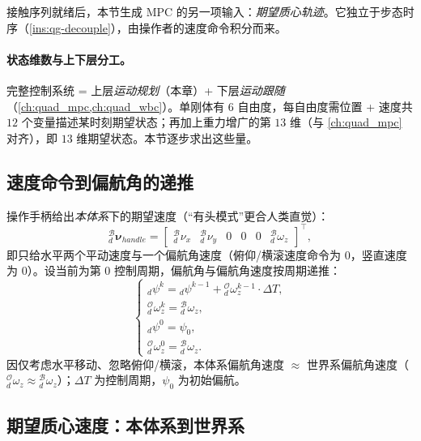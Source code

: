 接触序列就绪后，本节生成 MPC 的另一项输入：\emph{期望质心轨迹}。它独立于步态时序（\cref{ins:qg-decouple}），由操作者的速度命令积分而来。

\paragraph{状态维数与上下层分工。}
完整控制系统 = 上层\emph{运动规划}（本章）+ 下层\emph{运动跟随}（\cref{ch:quad_mpc,ch:quad_wbc}）。单刚体有 $6$ 自由度，每自由度需位置 + 速度共 $12$ 个变量描述某时刻期望状态；再加上重力增广的第 $13$ 维（与 \cref{ch:quad_mpc} 对齐），即 $13$ 维期望状态\cite{yu2021quadruped}。本节逐步求出这些量。

\subsection{速度命令到偏航角的递推}
\label{subsec:qg-yaw}

操作手柄给出\emph{本体系}下的期望速度（“有头模式”更合人类直觉）\cite{yu2021quadruped}：
\begin{equation}
  {}_d^{\mathcal{B}}\boldsymbol{\nu}_{handle}=
  \begin{bmatrix} {}_d^{\mathcal{B}}\nu_x & {}_d^{\mathcal{B}}\nu_y & 0 & 0 & 0 & {}_d^{\mathcal{B}}\omega_z\end{bmatrix}^\top,
  \label{eq:qg-handle}
\end{equation}
即只给水平两个平动速度与一个偏航角速度（俯仰/横滚速度命令为 $0$，竖直速度为 $0$）。设当前为第 $0$ 控制周期，偏航角与偏航角速度按周期递推\cite{yu2021quadruped}：
\begin{equation}
  \begin{cases}
  {}_d\psi^{k}={}_d\psi^{k-1}+{}_d^{\mathcal{O}}\omega_z^{k-1}\cdot\Delta T,\\
  {}_d^{\mathcal{O}}\omega_z^{k}={}_d^{\mathcal{B}}\omega_z,\\
  {}_d\psi^{0}=\psi_0,\\
  {}_d^{\mathcal{O}}\omega_z^{0}={}_d^{\mathcal{B}}\omega_z.
  \end{cases}
  \label{eq:qg-yaw-recur}
\end{equation}
因仅考虑水平移动、忽略俯仰/横滚，本体系偏航角速度 $\approx$ 世界系偏航角速度（${}_d^{\mathcal{O}}\omega_z\approx{}_d^{\mathcal{B}}\omega_z$）；$\Delta T$ 为控制周期，$\psi_0$ 为初始偏航\cite{yu2021quadruped}。

\subsection{期望质心速度：本体系到世界系}
\label{subsec:qg-vel}

